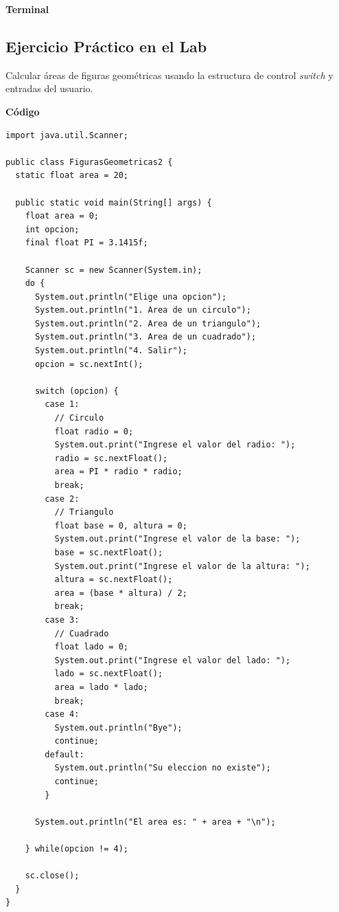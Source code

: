 \documentclass[11pt, twocolumn]{article}
\begin{document}
  \textbf{Terminal}

  \subsection*{Ejercicio Práctico en el Lab}
  Calcular áreas de figuras geométricas usando la estructura de control \textit{switch} y entradas del usuario.

  \textbf{Código}
  \begin{lstlisting}
import java.util.Scanner;

public class FigurasGeometricas2 {
  static float area = 20;
  
  public static void main(String[] args) {
    float area = 0;
    int opcion;
    final float PI = 3.1415f;

    Scanner sc = new Scanner(System.in);
    do {
      System.out.println("Elige una opcion");
      System.out.println("1. Area de un circulo");
      System.out.println("2. Area de un triangulo");
      System.out.println("3. Area de un cuadrado");
      System.out.println("4. Salir");
      opcion = sc.nextInt();

      switch (opcion) {
        case 1:
          // Circulo
          float radio = 0;
          System.out.print("Ingrese el valor del radio: ");
          radio = sc.nextFloat();
          area = PI * radio * radio;
          break;
        case 2:
          // Triangulo
          float base = 0, altura = 0;
          System.out.print("Ingrese el valor de la base: ");
          base = sc.nextFloat();
          System.out.print("Ingrese el valor de la altura: ");
          altura = sc.nextFloat();
          area = (base * altura) / 2;
          break;
        case 3: 
          // Cuadrado
          float lado = 0;
          System.out.print("Ingrese el valor del lado: ");
          lado = sc.nextFloat();
          area = lado * lado;
          break;
        case 4:
          System.out.println("Bye");
          continue;
        default: 
          System.out.println("Su eleccion no existe");
          continue;
        }

      System.out.println("El area es: " + area + "\n");

    } while(opcion != 4);
    
    sc.close();
  }
} 
  \end{lstlisting}
\end{document}
